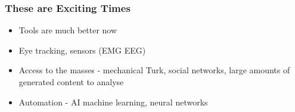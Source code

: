 \begin{frame}
	\frametitle{These are Exciting Times}
	\begin{itemize}
		\item Tools are much better now
		\item Eye tracking, sensors (EMG EEG)
		\item Access to the masses - mechanical Turk, social networks, large amounts of generated content to analyse
		\item Automation - AI machine learning, neural networks
	\end{itemize}
\end{frame}





